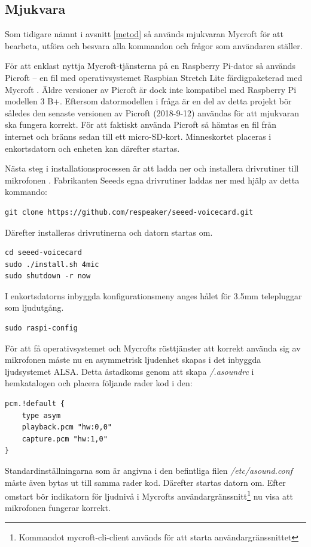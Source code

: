 \subsection{Mjukvara}
Som tidigare nämnt i avsnitt \ref{metod} så används mjukvaran Mycroft för att bearbeta, utföra och besvara alla kommandon och frågor som användaren ställer. 

För att enklast nyttja Mycroft-tjänsterna på en Raspberry Pi-dator så används Picroft – en fil med operativsystemet Raspbian Stretch Lite färdig\-paketerad med Mycroft \cite{picroft}. Äldre versioner av Picroft är dock inte kompatibel med Raspberry Pi modellen 3 B+.  Eftersom datormodellen i fråga är en del av detta projekt bör således den senaste versionen av Picroft (2018-9-12) användas för att mjukvaran ska fungera korrekt. För att faktiskt använda Picroft så hämtas en fil från internet och bränns sedan till ett micro-SD-kort. Minneskortet placeras i enkortsdatorn och enheten kan därefter startas.

Nästa steg i installationsprocessen är att ladda ner och installera drivrutiner till mikrofonen \cite{seeeds_documentation, reaspeker-installation}. Fabrikanten Seeeds egna drivrutiner laddas ner med hjälp av detta kommando:
\begin{verbatim}
git clone https://github.com/respeaker/seeed-voicecard.git
\end{verbatim}
Därefter installeras drivrutinerna och datorn startas om.
\begin{verbatim}
cd seeed-voicecard
sudo ./install.sh 4mic
sudo shutdown -r now
\end{verbatim}
I enkortsdatorns inbyggda konfigurationsmeny anges hålet för 3.5mm telepluggar som ljudutgång. 
\begin{verbatim}
sudo raspi-config
\end{verbatim}
För att få operativsystemet och Mycrofts rösttjänster att korrekt använda sig av mikrofonen måste nu en asymmetrisk ljudenhet skapas i det inbyggda ljudsystemet ALSA. Detta åstadkoms genom att skapa \textit{/.asoundrc} i hemkatalogen och placera följande rader kod i den:
\begin{verbatim}
pcm.!default {
    type asym
    playback.pcm "hw:0,0"
    capture.pcm "hw:1,0"
}
\end{verbatim}

\noindent Standardinställningarna som är angivna i den befintliga filen \textit{/etc/asound.conf} måste även bytas ut till samma rader kod. Därefter startas datorn om. Efter omstart bör indikatorn för ljudnivå i Mycrofts användargränssnitt\footnote{Kommandot mycroft-cli-client används för att starta användargränssnittet} nu visa att mikrofonen fungerar korrekt. 

